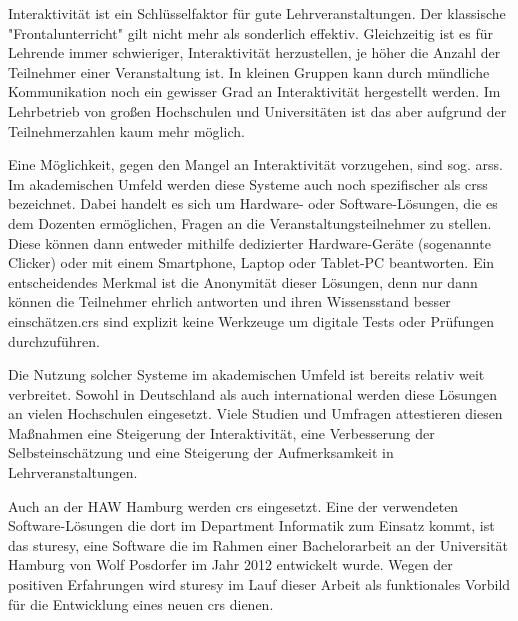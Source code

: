 Interaktivität ist ein Schlüsselfaktor für gute Lehrveranstaltungen. Der klassische "Frontalunterricht" gilt nicht mehr als sonderlich effektiv. Gleichzeitig ist es für Lehrende immer schwieriger, Interaktivität herzustellen, je höher die Anzahl der Teilnehmer einer Veranstaltung ist. In kleinen Gruppen kann durch mündliche Kommunikation noch ein gewisser Grad an Interaktivität hergestellt werden. Im Lehrbetrieb von großen Hochschulen und Universitäten ist das aber aufgrund der Teilnehmerzahlen kaum mehr möglich.

Eine Möglichkeit, gegen den Mangel an Interaktivität vorzugehen, sind sog. \acp{ars}. Im akademischen Umfeld werden diese Systeme auch noch spezifischer als \acp{crs} bezeichnet. Dabei handelt es sich um Hardware- oder Software-Lösungen, die es dem Dozenten ermöglichen, Fragen an die Veranstaltungsteilnehmer zu stellen. Diese können dann entweder mithilfe dedizierter Hardware-Geräte (sogenannte Clicker) oder mit einem Smartphone, Laptop oder Tablet-PC beantworten. Ein entscheidendes Merkmal ist die Anonymität dieser Lösungen, denn nur dann können die Teilnehmer ehrlich antworten und ihren Wissensstand besser einschätzen.\ac{crs} sind explizit keine Werkzeuge um digitale Tests oder Prüfungen  durchzuführen.

Die Nutzung solcher Systeme im akademischen Umfeld ist bereits relativ weit verbreitet. Sowohl in Deutschland als auch international werden diese Lösungen an vielen Hochschulen eingesetzt. Viele Studien und Umfragen attestieren diesen Maßnahmen eine Steigerung der Interaktivität, eine Verbesserung der Selbsteinschätzung und eine Steigerung der Aufmerksamkeit in Lehrveranstaltungen.

Auch an der HAW Hamburg werden \ac{crs} eingesetzt. Eine der verwendeten Software-Lösungen die dort im Department Informatik zum Einsatz kommt, ist das \ac{sturesy}, eine Software die im Rahmen einer Bachelorarbeit an der Universität Hamburg von Wolf Posdorfer im Jahr 2012 entwickelt wurde. Wegen der positiven Erfahrungen wird \ac{sturesy}  im Lauf dieser Arbeit als funktionales Vorbild für die Entwicklung eines neuen \ac{crs} dienen.